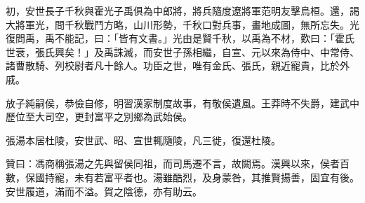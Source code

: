 \begin{pinyinscope}
初，安世長子千秋與霍光子禹俱為中郎將，將兵隨度遼將軍范明友擊烏桓。還，謁大將軍光，問千秋戰鬥方略，山川形勢，千秋口對兵事，畫地成圖，無所忘失。光復問禹，禹不能記，曰：「皆有文書。」光由是賢千秋，以禹為不材，歎曰：「霍氏世衰，張氏興矣！」及禹誅滅，而安世子孫相繼，自宣、元以來為侍中、中常侍、諸曹散騎、列校尉者凡十餘人。功臣之世，唯有金氏、張氏，親近寵貴，比於外戚。

放子純嗣侯，恭儉自修，明習漢家制度故事，有敬侯遺風。王莽時不失爵，建武中歷位至大司空，更封富平之別鄉為武始侯。

張湯本居杜陵，安世武、昭、宣世輒隨陵，凡三徙，復還杜陵。

贊曰：馮商稱張湯之先與留侯同祖，而司馬遷不言，故闕焉。漢興以來，侯者百數，保國持寵，未有若富平者也。湯雖酷烈，及身蒙咎，其推賢揚善，固宜有後。安世履道，滿而不溢。賀之陰德，亦有助云。


\end{pinyinscope}